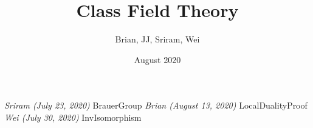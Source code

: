 \documentclass{article}
\title{Class Field Theory}
\author{Brian, JJ, Sriram, Wei}
\date{August 2020}
\begin{document}
\maketitle

\emph{Sriram (July 23, 2020)}
{BrauerGroup}
\newpage
\emph{Brian (August 13, 2020)}
{LocalDualityProof}
\emph{Wei (July 30, 2020)}
{InvIsomorphism}
\end{document}
